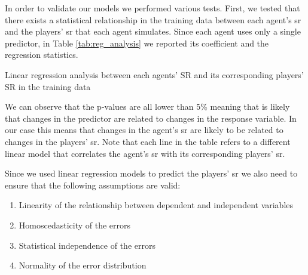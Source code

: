 In order to validate our models we performed various tests.
First, we tested that there exists a statistical relationship in the training data between each agent's \acs{sr} and the players' \acs{sr} that each agent simulates. Since each agent uses only a single predictor, in Table \ref{tab:reg_analysis} we reported its coefficient and the regression statistics. 
\begin{table}[h]
    \centering
    \small
    \caption{Linear regression analysis between each agents' SR and its corresponding players' SR in the training data} 
    
    \label{tab:reg_analysis}
\end{table} 
We can observe that the p-values are all lower than 5\% meaning that is likely that changes in the predictor are related to changes in the response variable. In our case this means that changes in the agent's \acs{sr} are likely to be related to changes in the players' \acs{sr}. Note that each line in the table refers to a different linear model that correlates the agent's \acs{sr} with its corresponding players' \acs{sr}. 

Since we used linear regression models to predict the players' \acs{sr} we also need to ensure that the following assumptions are valid:
\begin{enumerate}
    \item Linearity of the relationship between dependent and independent variables
    \item Homoscedasticity of the errors
    \item Statistical independence of the errors
    \item Normality of the error distribution
\end{enumerate}

